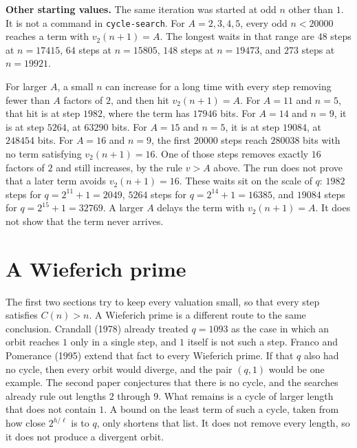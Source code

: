 \documentclass[11pt]{article}
\newcommand{\topic}[1]{\par\noindent\textbf{#1}}
\begin{document}
\topic{Other starting values.}
The same iteration was started at odd \(n\) other than \(1\).
It is not a command in \texttt{cycle-search}.
For \(A = 2, 3, 4, 5\), every odd \(n < 20000\) reaches a term with \(v_2(n+1) = A\).
The longest waits in that range are \(48\) steps at \(n = 17415\), \(64\) steps at \(n = 15805\), \(148\) steps at \(n = 19473\), and \(273\) steps at \(n = 19921\).

For larger \(A\), a small \(n\) can increase for a long time with every step removing fewer than \(A\) factors of \(2\), and then hit \(v_2(n+1) = A\).
For \(A = 11\) and \(n = 5\), that hit is at step \(1982\), where the term has \(17946\) bits.
For \(A = 14\) and \(n = 9\), it is at step \(5264\), at \(63290\) bits.
For \(A = 15\) and \(n = 5\), it is at step \(19084\), at \(248454\) bits.
For \(A = 16\) and \(n = 9\), the first \(20000\) steps reach \(280038\) bits with no term satisfying \(v_2(n+1) = 16\).
One of those steps removes exactly \(16\) factors of \(2\) and still increases, by the rule \(v > A\) above.
The run does not prove that a later term avoids \(v_2(n+1) = 16\).
These waits sit on the scale of \(q\): \(1982\) steps for \(q = 2^{11} + 1 = 2049\), \(5264\) steps for \(q = 2^{14} + 1 = 16385\), and \(19084\) steps for \(q = 2^{15} + 1 = 32769\).
A larger \(A\) delays the term with \(v_2(n+1) = A\).
It does not show that the term never arrives.

\section{A Wieferich prime}
\label{sec:wieferich}

The first two sections try to keep every valuation small, so that every step satisfies \(C(n) > n\).
A Wieferich prime is a different route to the same conclusion.
Crandall (1978) already treated \(q = 1093\) as the case in which an orbit reaches \(1\) only in a single step, and \(1\) itself is not such a step.
Franco and Pomerance (1995) extend that fact to every Wieferich prime.
If that \(q\) also had no cycle, then every orbit would diverge, and the pair \((q, 1)\) would be one example.
The second paper conjectures that there is no cycle, and the searches already rule out lengths \(2\) through \(9\).
What remains is a cycle of larger length that does not contain \(1\).
A bound on the least term of such a cycle, taken from how close \(2^{h/\ell}\) is to \(q\), only shortens that list.
It does not remove every length, so it does not produce a divergent orbit.
\end{document}
